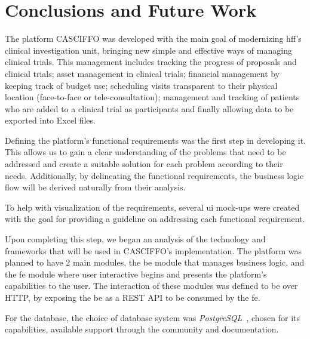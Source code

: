 % 
%
\chapter{Conclusions and Future Work}\label{ch:conclusion}

The platform CASCIFFO was developed with the main goal of modernizing \acrshort{hff}'s clinical investigation unit, bringing new simple and effective ways of managing clinical trials. 
This management includes tracking the progress of proposals and clinical trials; asset management in clinical trials; financial management by keeping track of budget use; scheduling visits transparent to their physical location (face-to-face or tele-consultation); management and tracking of patients who are added to a clinical trial as participants and finally allowing data to be exported into Excel files.

Defining the platform's functional requirements was the first step in developing it. This allows us to gain a clear understanding of the problems that need to be addressed and create a suitable solution for each problem according to their needs. Additionally, by delineating the functional requirements, the business logic flow will be derived naturally from their analysis. 

To help with visualization of the requirements, several \acrfull{ui} mock-ups were created with the goal for providing a guideline on addressing each functional requirement.

Upon completing this step, we began an analysis of the technology and frameworks that will be used in CASCIFFO's implementation. 
The platform was planned to have 2 main modules, the \acrfull{be} module that manages business logic, and the \acrfull{fe} module where user interactive begins and presents the platform's capabilities to the user. The interaction of these modules was defined to be over HTTP, by exposing the \acrshort{be} as a REST API to be consumed by the \acrshort{fe}.

For the database, the choice of database system was \textit{PostgreSQL}~\cite{postgresql}, chosen for its capabilities, available support through the community and documentation.

